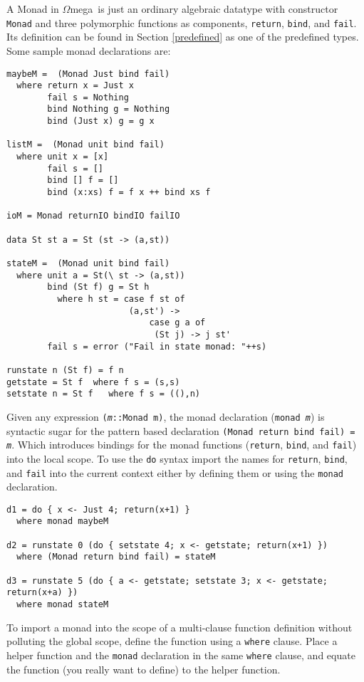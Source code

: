 \documentclass[11pt,twoside]{article}
\newcommand{\om}{$\Omega$mega}
\begin{document}
\vspace*{.2in}
A Monad in \om\ is just an ordinary algebraic datatype with constructor {\tt
Monad} and three polymorphic functions as components, {\tt return}, {\tt bind},
and {\tt fail}. Its definition can be found in Section \ref{predefined} as one
of the predefined types. Some sample monad declarations are:

\begin{multicols}{2}
{\small
\begin{verbatim}
maybeM =  (Monad Just bind fail)
  where return x = Just x
        fail s = Nothing
        bind Nothing g = Nothing
        bind (Just x) g = g x

listM =  (Monad unit bind fail)
  where unit x = [x]
        fail s = []
        bind [] f = []
        bind (x:xs) f = f x ++ bind xs f

ioM = Monad returnIO bindIO failIO

data St st a = St (st -> (a,st))

stateM =  (Monad unit bind fail)
  where unit a = St(\ st -> (a,st))
        bind (St f) g = St h
          where h st = case f st of
                        (a,st') ->
                            case g a of
                             (St j) -> j st'
        fail s = error ("Fail in state monad: "++s)

runstate n (St f) = f n
getstate = St f  where f s = (s,s)
setstate n = St f   where f s = ((),n)
\end{verbatim}}
\end{multicols}



Given any expression {\tt ({\it m}::Monad m)}, the monad declaration
({\tt monad {\it m}}) is syntactic sugar for the pattern based
declaration {\tt (Monad return bind fail) = {\it m}}. Which
introduces bindings for the monad functions
({\tt return}, {\tt bind}, and {\tt fail}) into the local scope.
To use the {\tt do} syntax import the names for {\tt return},
{\tt bind}, and {\tt fail} into the current context either by
defining them or using the {\tt monad} declaration.
\begin{verbatim}
d1 = do { x <- Just 4; return(x+1) }
  where monad maybeM

d2 = runstate 0 (do { setstate 4; x <- getstate; return(x+1) })
  where (Monad return bind fail) = stateM

d3 = runstate 5 (do { a <- getstate; setstate 3; x <- getstate; return(x+a) })
  where monad stateM
\end{verbatim}
To import a monad into the scope of a multi-clause function definition without
polluting the global scope, define the function using a {\tt where} clause.
Place a helper function and the {\tt monad} declaration in the same {\tt where}
clause, and equate the function (you really want to define) to the helper function.
\end{document}
